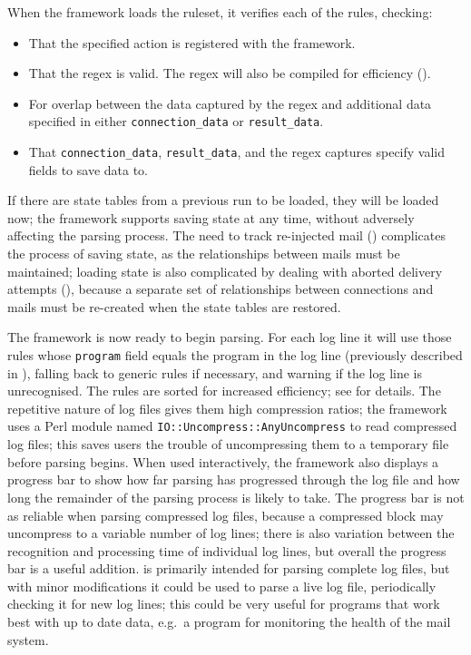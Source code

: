 When the framework loads the ruleset, it verifies each of the rules,
checking:

\begin{itemize}

    \squeezeitems{}

    \item That the specified action is registered with the framework.

    \item That the regex is valid.  The regex will also be compiled for
        efficiency ().

    \item For overlap between the data captured by the regex and additional
        data specified in either \texttt{connection\_data} or
        \texttt{result\_data}.

    \item That \texttt{connection\_data}, \texttt{result\_data}, and the
        regex captures specify valid fields to save data to.

\end{itemize}

If there are state tables from a previous \parsername{} run to be loaded,
they will be loaded now; the framework supports saving state at any time,
without adversely affecting the parsing process.  The need to track
re-injected mail () complicates the process
of saving state, as the relationships between mails must be maintained;
loading state is also complicated by dealing with aborted delivery attempts
(), because a separate set of
relationships between connections and mails must be re-created when the
state tables are restored.

The framework is now ready to begin parsing.  For each log line it will use
those rules whose \texttt{program} field equals the program in the log line
(previously described in ),
falling back to generic rules if necessary, and warning if the log line is
unrecognised.  The rules are sorted for increased efficiency; see
 for details.  The repetitive
nature of log files gives them high compression ratios; the framework uses
a Perl module named \texttt{IO::Uncompress::AnyUncompress} to read
compressed log files; this saves users the trouble of uncompressing them to
a temporary file before parsing begins.  When used interactively, the
framework also displays a progress bar to show how far parsing has
progressed through the log file and how long the remainder of the parsing
process is likely to take.  The progress bar is not as reliable when
parsing compressed log files, because a compressed block may uncompress to
a variable number of log lines; there is also variation between the
recognition and processing time of individual log lines, but overall the
progress bar is a useful addition.  \parsername{} is primarily intended for
parsing complete log files, but with minor modifications it could be used
to parse a live log file, periodically checking it for new log lines; this
could be very useful for programs that work best with up to date data,
e.g.\ a program for monitoring the health of the mail system.

